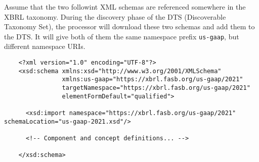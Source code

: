     
    
    




Assume that the two followint XML schemas are referenced somewhere in the XBRL taxonomy. During the discovery phase of the DTS (Discoverable Taxonomy Set),
the processor will download these two schemas and add them to the DTS. It will give both of them the same namespace prefix \texttt{us-gaap}, but different namespace URIs.

\begin{lstlisting}
    <?xml version="1.0" encoding="UTF-8"?>
    <xsd:schema xmlns:xsd="http://www.w3.org/2001/XMLSchema"
                xmlns:us-gaap="https://xbrl.fasb.org/us-gaap/2021"
                targetNamespace="https://xbrl.fasb.org/us-gaap/2021"
                elementFormDefault="qualified">
    
      <xsd:import namespace="https://xbrl.fasb.org/us-gaap/2021" schemaLocation="us-gaap-2021.xsd"/>
    
      <!-- Component and concept definitions... -->
    
    </xsd:schema>
    

\end{lstlisting}

